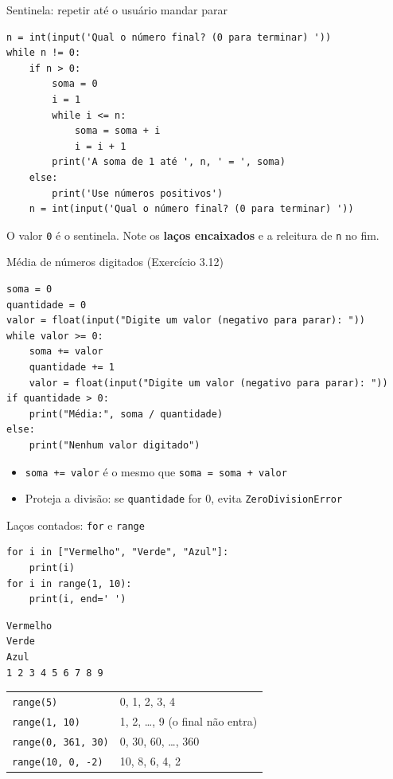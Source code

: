 \documentclass[aspectratio=169,10pt,t]{beamer}
\begin{document}
\begin{frame}[fragile]{Sentinela: repetir até o usuário mandar parar}
\begin{lstlisting}
n = int(input('Qual o número final? (0 para terminar) '))
while n != 0:
    if n > 0:
        soma = 0
        i = 1
        while i <= n:
            soma = soma + i
            i = i + 1
        print('A soma de 1 até ', n, ' = ', soma)
    else:
        print('Use números positivos')
    n = int(input('Qual o número final? (0 para terminar) '))
\end{lstlisting}
  \small O valor \texttt{0} é o \alert{sentinela}. Note os \textbf{laços encaixados} e a releitura de \texttt{n} no fim.\\
\end{frame}

\begin{frame}[fragile]{Média de números digitados (Exercício 3.12)}
\begin{lstlisting}
soma = 0
quantidade = 0
valor = float(input("Digite um valor (negativo para parar): "))
while valor >= 0:
    soma += valor
    quantidade += 1
    valor = float(input("Digite um valor (negativo para parar): "))
if quantidade > 0:
    print("Média:", soma / quantidade)
else:
    print("Nenhum valor digitado")
\end{lstlisting}
  \begin{itemize}
    \item \texttt{soma += valor} é o mesmo que \texttt{soma = soma + valor}
    \item Proteja a divisão: se \texttt{quantidade} for 0, evita \texttt{ZeroDivisionError}
  \end{itemize}
\end{frame}

\begin{frame}[fragile]{Laços contados: \texttt{for} e \texttt{range}}
\begin{lstlisting}
for i in ["Vermelho", "Verde", "Azul"]:
    print(i)
for i in range(1, 10):
    print(i, end=' ')
\end{lstlisting}
\begin{lstlisting}[style=saida]
Vermelho
Verde
Azul
1 2 3 4 5 6 7 8 9
\end{lstlisting}
  \begin{center}\small
  \begin{tabular}{ll}
    \toprule
    \texttt{range(5)} & 0, 1, 2, 3, 4\\
    \texttt{range(1, 10)} & 1, 2, \ldots, 9 (o final \alert{não} entra)\\
    \texttt{range(0, 361, 30)} & 0, 30, 60, \ldots, 360\\
    \texttt{range(10, 0, -2)} & 10, 8, 6, 4, 2\\
    \bottomrule
  \end{tabular}
  \end{center}
\end{frame}
\end{document}
